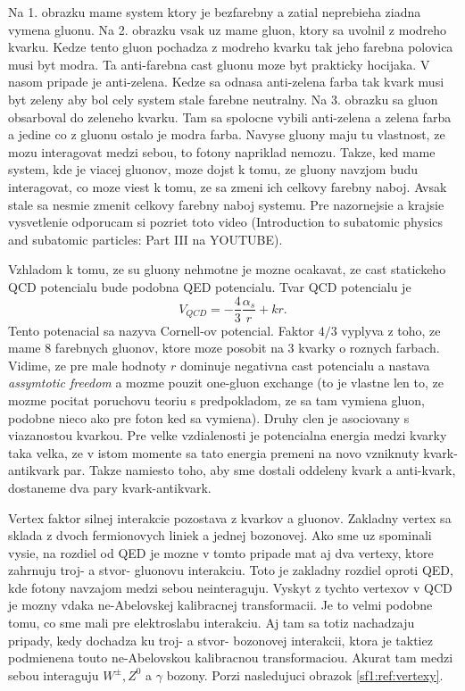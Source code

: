 \documentclass[../../main.tex]{subfiles}
\begin{document}
Na 1. obrazku mame system ktory je bezfarebny a zatial neprebieha ziadna vymena gluonu. Na 2. obrazku vsak uz mame gluon, ktory sa uvolnil z modreho kvarku. Kedze tento gluon pochadza z modreho kvarku tak jeho farebna polovica musi byt modra. Ta anti-farebna cast gluonu moze byt prakticky hocijaka. V nasom pripade je anti-zelena. Kedze sa odnasa anti-zelena farba tak kvark musi byt zeleny aby bol cely system stale farebne neutralny. Na 3. obrazku sa gluon obsarboval do zeleneho kvarku. Tam sa spolocne vybili anti-zelena a zelena farba a jedine co z gluonu ostalo je modra farba. Navyse gluony maju tu vlastnost, ze mozu interagovat medzi sebou, to fotony napriklad nemozu. Takze, ked mame system, kde je viacej gluonov, moze dojst k tomu, ze gluony navzjom budu interagovat, co moze viest k tomu, ze sa zmeni ich celkovy farebny naboj. Avsak stale sa nesmie zmenit celkovy farebny naboj systemu. Pre nazornejsie a krajsie vysvetlenie odporucam si pozriet toto video (Introduction to subatomic physics and subatomic particles: Part III na YOUTUBE).\par
Vzhladom k tomu, ze su gluony nehmotne je mozne ocakavat, ze cast statickeho QCD potencialu bude podobna QED potencialu. Tvar QCD potencialu je 
$$
V_{QCD}=-\frac{4}{3}\frac{\alpha_s}{r}+kr.
$$ 
Tento potenacial sa nazyva Cornell-ov potencial. Faktor $4/3$ vyplyva z toho, ze mame 8 farebnych gluonov, ktore moze posobit na 3 kvarky o roznych farbach. Vidime, ze pre male hodnoty $r$ dominuje negativna cast potencialu a nastava \textit{assymtotic freedom} a mozme pouzit one-gluon exchange (to je vlastne len to, ze mozme pocitat poruchovu teoriu s predpokladom, ze sa tam vymiena gluon, podobne nieco ako pre foton ked sa vymiena). Druhy clen je asociovany s viazanostou kvarkou. Pre velke vzdialenosti je potencialna energia medzi kvarky taka velka, ze v istom momente sa tato energia premeni na novo vzniknuty kvark-antikvark par. Takze namiesto toho, aby sme dostali oddeleny kvark a anti-kvark, dostaneme dva pary kvark-antikvark.\par
Vertex faktor silnej interakcie pozostava z kvarkov a gluonov. Zakladny vertex sa sklada z dvoch fermionovych liniek a jednej bozonovej. Ako sme uz spominali vysie, na rozdiel od QED je mozne v tomto pripade mat aj dva vertexy, ktore zahrnuju troj- a stvor- gluonovu interakciu. Toto je zakladny rozdiel oproti QED, kde fotony navzajom medzi sebou neinteraguju. Vyskyt z tychto vertexov v QCD je mozny vdaka ne-Abelovskej kalibracnej transformacii. Je to velmi podobne tomu, co sme mali pre elektroslabu interakciu. Aj tam sa totiz nachadzaju pripady, kedy dochadza ku troj- a stvor- bozonovej interakcii, ktora je taktiez podmienena touto ne-Abelovskou kalibracnou transformaciou. Akurat tam medzi sebou interaguju $W^{\pm}, Z^0$ a $ \gamma$ bozony. Porzi nasledujuci obrazok \ref{sf1:ref:vertexy}.
\end{document}
